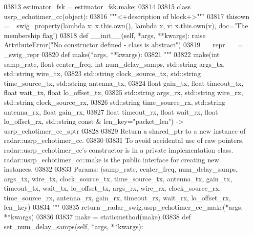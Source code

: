 \begin{DoxyCode}
{{{{{{{{{{{{{{03813 estimator\_fsk = estimator\_fsk.make;
03814 
03815 \textcolor{keyword}{class }usrp_echotimer_cc(object):
03816     \textcolor{stringliteral}{"""<+description of block+>"""}
03817     thisown = _swig_property(\textcolor{keyword}{lambda} x: x.this.own(), \textcolor{keyword}{lambda} x, v: x.this.own(v), doc=\textcolor{stringliteral}{'The membership flag'})
03818     \textcolor{keyword}{def }__init__(self, *args, **kwargs): \textcolor{keywordflow}{raise} AttributeError(\textcolor{stringliteral}{"No constructor defined - class is abstract"})
03819     \_\_repr\_\_ = \_swig\_repr
03820     \textcolor{keyword}{def }make(*args, **kwargs):
03821         \textcolor{stringliteral}{"""}
03822 \textcolor{stringliteral}{        make(int samp\_rate, float center\_freq, int num\_delay\_samps, std::string args\_tx, std::string
       wire\_tx, }
03823 \textcolor{stringliteral}{            std::string clock\_source\_tx, std::string time\_source\_tx, std::string antenna\_tx, }
03824 \textcolor{stringliteral}{            float gain\_tx, float timeout\_tx, float wait\_tx, float lo\_offset\_tx, }
03825 \textcolor{stringliteral}{            std::string args\_rx, std::string wire\_rx, std::string clock\_source\_rx, }
03826 \textcolor{stringliteral}{            std::string time\_source\_rx, std::string antenna\_rx, float gain\_rx, }
03827 \textcolor{stringliteral}{            float timeout\_rx, float wait\_rx, float lo\_offset\_rx, std::string const & len\_key="packet\_len")
       -> usrp\_echotimer\_cc\_sptr}
03828 \textcolor{stringliteral}{}
03829 \textcolor{stringliteral}{        Return a shared\_ptr to a new instance of radar::usrp\_echotimer\_cc.}
03830 \textcolor{stringliteral}{}
03831 \textcolor{stringliteral}{        To avoid accidental use of raw pointers, radar::usrp\_echotimer\_cc's constructor is in a private
       implementation class. radar::usrp\_echotimer\_cc::make is the public interface for creating new instances.}
03832 \textcolor{stringliteral}{}
03833 \textcolor{stringliteral}{        Params: (samp\_rate, center\_freq, num\_delay\_samps, args\_tx, wire\_tx, clock\_source\_tx,
       time\_source\_tx, antenna\_tx, gain\_tx, timeout\_tx, wait\_tx, lo\_offset\_tx, args\_rx, wire\_rx, clock\_source\_rx, time\_source\_rx,
       antenna\_rx, gain\_rx, timeout\_rx, wait\_rx, lo\_offset\_rx, len\_key)}
03834 \textcolor{stringliteral}{        """}
03835         \textcolor{keywordflow}{return} \_radar\_swig.usrp\_echotimer\_cc\_make(*args, **kwargs)
03836 
03837     make = staticmethod(make)
03838     \textcolor{keyword}{def }set_num_delay_samps(self, *args, **kwargs):
}}}}}}}}}}}}}}
\end{DoxyCode}
